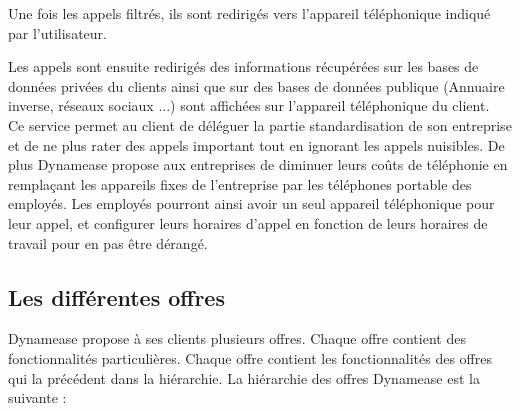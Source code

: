 Une fois les appels filtrés, ils sont redirigés vers l'appareil téléphonique indiqué par l'utilisateur.

Les appels sont ensuite redirigés des informations récupérées sur les bases de données privées du clients ainsi que sur des bases de données publique (Annuaire inverse, réseaux sociaux ...) sont affichées sur l'appareil téléphonique du client.\\

Ce service permet au client de déléguer la partie standardisation de son entreprise et de ne plus rater des appels important tout en ignorant les appels nuisibles. De plus Dynamease propose aux entreprises de diminuer leurs coûts de téléphonie en remplaçant les appareils fixes de l'entreprise par les téléphones portable des employés. Les employés pourront ainsi avoir un seul appareil téléphonique pour leur appel, et configurer leurs horaires d'appel en fonction de leurs horaires de travail pour en pas être dérangé.

\subsection{Les différentes offres}

Dynamease propose à ses clients plusieurs offres. Chaque offre contient des fonctionnalités particulières. Chaque offre contient les fonctionnalités des offres qui la précédent dans la hiérarchie. La hiérarchie des offres Dynamease est la suivante :

